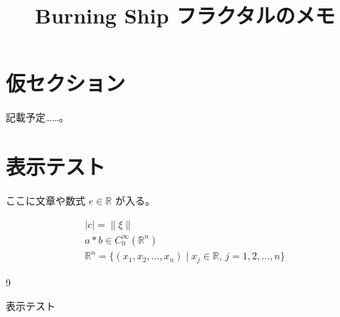\documentclass[12pt]{jsarticle}
\numberwithin{equation}{section}%
\newcommand{\R}{\mathbb{R}}
\newcommand{\Rn}{\mathbb{R}^n} %
\newcommand{\Cinf}{C^{\infty}} %
\newcommand{\x}{\xi}
\newcommand{\norm}[1]{\left\lVert#1\right\rVert}
\newcommand{\abs}[1]{\left\lvert#1\right\rvert}
\newcommand{\conv}[2]{#1 \ast #2} %
\newcommand{\oneto}[1]{1, 2, \ldots, #1} %
\newcommand{\coord}[2]{(#1_1, #1_2, \ldots, #1_#2)} %
\begin{document}
\title{Burning Ship フラクタルのメモ}
\author{}
\date{}
\maketitle


\section{仮セクション}

記載予定……。

\section{表示テスト}

ここに文章や数式 $e \in \R$ が入る。

\begin{gather}
\abs{c} = \norm{\x} \\
\conv{a}{b} \in \Cinf_0(\Rn) \\
\Rn = \{ \coord{x}{n} \mid x_j \in \R , \, j = \oneto{n} \} 
\end{gather}









\begin{thebibliography}{9}

 表示テスト

\end{thebibliography}
\end{document}
